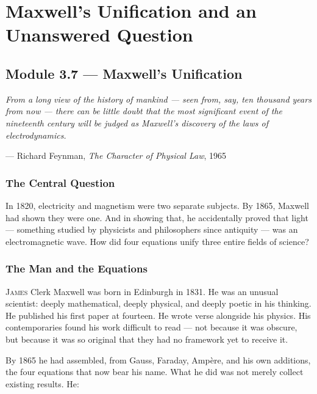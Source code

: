 \documentclass[12pt, a4paper, twoside]{book}
\theoremstyle{disc}
\begin{document}
\chapter{Maxwell's Unification and an Unanswered Question}

\section{Module 3.7 — Maxwell's Unification}
\label{sec:maxwell_unification}

\epigraph{\itshape
  From a long view of the history of mankind --- seen from, say, ten thousand years
  from now --- there can be little doubt that the most significant event of the
  nineteenth century will be judged as Maxwell's discovery of the laws of
  electrodynamics.
}{--- Richard Feynman, \textit{The Character of Physical Law}, 1965}

\subsection{The Central Question}

\begin{puzzlebox}
In 1820, electricity and magnetism were two separate subjects. By 1865, Maxwell had shown they were one. And in showing that, he accidentally proved that light --- something studied by physicists and philosophers since antiquity --- was an electromagnetic wave. How did four equations unify three entire fields of science?
\end{puzzlebox}

\subsection{The Man and the Equations}

\lettrine[lines=3,loversize=0.08]{\textcolor{accent}{J}}{ames} Clerk Maxwell was born in Edinburgh in 1831. He was an unusual scientist: deeply mathematical, deeply physical, and deeply poetic in his thinking. He published his first paper at fourteen. He wrote verse alongside his physics. His contemporaries found his work difficult to read --- not because it was obscure, but because it was so original that they had no framework yet to receive it.

By 1865 he had assembled, from Gauss, Faraday, Amp\`ere, and his own additions, the four equations that now bear his name. What he did was not merely collect existing results. He:
\end{document}
